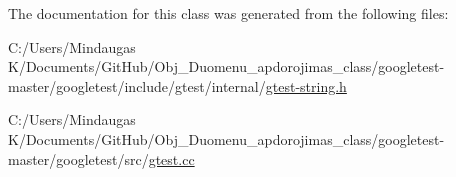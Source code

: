The documentation for this class was generated from the following files\+:\begin{DoxyCompactItemize}
\item 
C\+:/\+Users/\+Mindaugas K/\+Documents/\+Git\+Hub/\+Obj\+\_\+\+Duomenu\+\_\+apdorojimas\+\_\+class/googletest-\/master/googletest/include/gtest/internal/\mbox{\hyperlink{googletest-master_2googletest_2include_2gtest_2internal_2gtest-string_8h}{gtest-\/string.\+h}}\item 
C\+:/\+Users/\+Mindaugas K/\+Documents/\+Git\+Hub/\+Obj\+\_\+\+Duomenu\+\_\+apdorojimas\+\_\+class/googletest-\/master/googletest/src/\mbox{\hyperlink{googletest-master_2googletest_2src_2gtest_8cc}{gtest.\+cc}}\end{DoxyCompactItemize}
